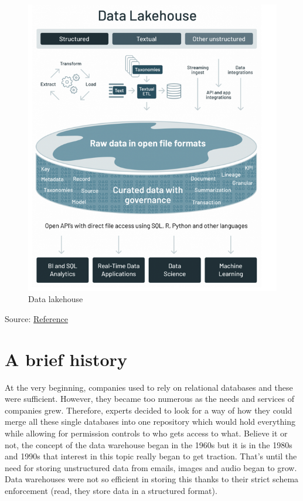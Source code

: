 \documentclass[
]{book}
\begin{document}
\begin{figure}
\centering
\includegraphics{./images/data_lakehouse.png}
\caption{Data lakehouse}
\end{figure}

Source: \href{https://www.databricks.com/blog/2021/05/19/evolution-to-the-data-lakehouse.html}{Reference}

\hypertarget{a-brief-history}{%
\section{A brief history}\label{a-brief-history}}

At the very beginning, companies used to rely on relational databases and these were sufficient. However, they became too numerous as the needs and services of companies grew. Therefore, experts decided to look for a way of how they could merge all these single databases into one repository which would hold everything while allowing for permission controls to who gets access to what. Believe it or not, the concept of the data warehouse began in the 1960s but it is in the 1980s and 1990s that interest in this topic really began to get traction. That's until the need for storing unstructured data from emails, images and audio began to grow. Data warehouses were not so efficient in storing this thanks to their strict schema enforcement (read, they store data in a structured format).
\end{document}
